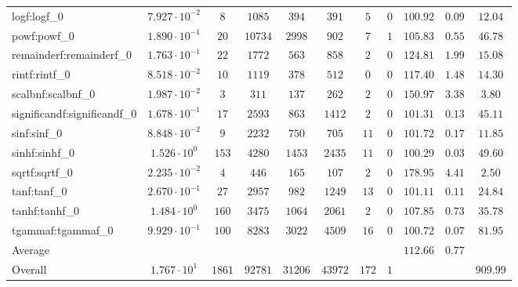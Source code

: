 \begin{tabular}{|l|c|c|c|c|c|c|c|c|c|c|}
logf:logf\_0                 & $ 7.927 \cdot 10^{-2} $ & $ 8      $ & $ 1085  $ & $ 394   $ & $ 391   $ & $ 5   $ & $ 0 $ & $ 100.92      $ & $ 0.09    $ & $ 12.04   $ \\
powf:powf\_0                 & $ 1.890 \cdot 10^{-1} $ & $ 20     $ & $ 10734 $ & $ 2998  $ & $ 902   $ & $ 7   $ & $ 1 $ & $ 105.83      $ & $ 0.55    $ & $ 46.78   $ \\
remainderf:remainderf\_0     & $ 1.763 \cdot 10^{-1} $ & $ 22     $ & $ 1772  $ & $ 563   $ & $ 858   $ & $ 2   $ & $ 0 $ & $ 124.81      $ & $ 1.99    $ & $ 15.08   $ \\
rintf:rintf\_0               & $ 8.518 \cdot 10^{-2} $ & $ 10     $ & $ 1119  $ & $ 378   $ & $ 512   $ & $ 0   $ & $ 0 $ & $ 117.40      $ & $ 1.48    $ & $ 14.30   $ \\
scalbnf:scalbnf\_0           & $ 1.987 \cdot 10^{-2} $ & $ 3      $ & $ 311   $ & $ 137   $ & $ 262   $ & $ 2   $ & $ 0 $ & $ 150.97      $ & $ 3.38    $ & $ 3.80    $ \\
significandf:significandf\_0 & $ 1.678 \cdot 10^{-1} $ & $ 17     $ & $ 2593  $ & $ 863   $ & $ 1412  $ & $ 2   $ & $ 0 $ & $ 101.31      $ & $ 0.13    $ & $ 45.11   $ \\
sinf:sinf\_0                 & $ 8.848 \cdot 10^{-2} $ & $ 9      $ & $ 2232  $ & $ 750   $ & $ 705   $ & $ 11  $ & $ 0 $ & $ 101.72      $ & $ 0.17    $ & $ 11.85   $ \\
sinhf:sinhf\_0               & $ 1.526 \cdot 10^{0}  $ & $ 153    $ & $ 4280  $ & $ 1453  $ & $ 2435  $ & $ 11  $ & $ 0 $ & $ 100.29      $ & $ 0.03    $ & $ 49.60   $ \\
sqrtf:sqrtf\_0               & $ 2.235 \cdot 10^{-2} $ & $ 4      $ & $ 446   $ & $ 165   $ & $ 107   $ & $ 2   $ & $ 0 $ & $ 178.95      $ & $ 4.41    $ & $ 2.50    $ \\
tanf:tanf\_0                 & $ 2.670 \cdot 10^{-1} $ & $ 27     $ & $ 2957  $ & $ 982   $ & $ 1249  $ & $ 13  $ & $ 0 $ & $ 101.11      $ & $ 0.11    $ & $ 24.84   $ \\
tanhf:tanhf\_0               & $ 1.484 \cdot 10^{0}  $ & $ 160    $ & $ 3475  $ & $ 1064  $ & $ 2061  $ & $ 2   $ & $ 0 $ & $ 107.85      $ & $ 0.73    $ & $ 35.78   $ \\
tgammaf:tgammaf\_0           & $ 9.929 \cdot 10^{-1} $ & $ 100    $ & $ 8283  $ & $ 3022  $ & $ 4509  $ & $ 16  $ & $ 0 $ & $ 100.72      $ & $ 0.07    $ & $ 81.95   $ \\
\hline
Average                      & $                     $ & $        $ & $       $ & $       $ & $       $ & $     $ & $   $ & $ 112.66      $ & $ 0.77    $ & $         $ \\
\hline
Overall                      & $ 1.767 \cdot 10^{1}  $ & $ 1861   $ & $ 92781 $ & $ 31206 $ & $ 43972 $ & $ 172 $ & $ 1 $ & $             $ & $         $ & $ 909.99  $ \\
\hline
\end{tabular}
